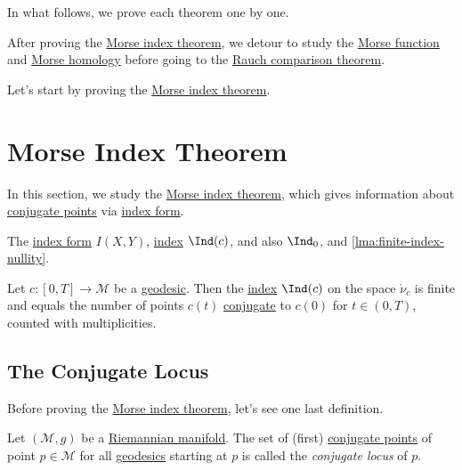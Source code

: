 In what follows, we prove each theorem one by one.

\begin{note}
	After proving the \hyperref[thm:Morse-index]{Morse index theorem}, we detour to study the \hyperref[def:Morse-function]{Morse function} and \hyperref[def:Morse-homology-group]{Morse homology} before going to the \hyperref[thm:Rauch-comparison]{Rauch comparison theorem}.
\end{note}

Let's start by proving the \hyperref[thm:Morse-index]{Morse index theorem}.

\section{Morse Index Theorem}
In this section, we study the \hyperref[thm:Morse-index]{Morse index theorem}, which gives information about \hyperref[def:conjugate-point]{conjugate points} via \hyperref[def:index-form]{index form}.

\begin{prev}
	The \hyperref[def:index-form]{index form} \(I(X, Y)\), \hyperref[def:index]{index} \(\Ind(c)\), and also \(\Ind_0 \), and \autoref{lma:finite-index-nullity}.
\end{prev}

Let \(c\colon [0, T] \to \mathcal{M} \) be a \hyperref[def:geodesic]{geodesic}. Then the \hyperref[def:index]{index} \(\Ind(c)\) on the space \(\mathring{\nu }_c\) is finite and equals the number of points \(c(t)\) \hyperref[def:conjugate-point]{conjugate} to \(c(0)\) for \(t\in (0, T)\), counted with multiplicities.

\subsection{The Conjugate Locus}
Before proving the \hyperref[thm:Morse-index]{Morse index theorem}, let's see one last definition.

\begin{definition}\label{def:conjugate-locus}
	Let \((\mathcal{M} , g)\) be a \hyperref[def:Riemannian-manifold]{Riemannian manifold}. The set of (first) \hyperref[def:conjugate-point]{conjugate points} of point \(p\in \mathcal{M} \) for all \hyperref[def:geodesic]{geodesics} starting at \(p\) is called the \emph{conjugate locus} of \(p\).
\end{definition}

